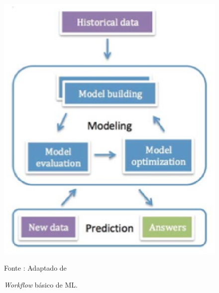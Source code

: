     \begin{figure}[ht]
            \centering
            \label{fig06}
                \includegraphics[keepaspectratio=true, scale=0.7]{editaveis/images/mlworkflow.eps}
            \caption{\textit{Workflow} básico de ML.}
            Fonte : Adaptado de \cite{brink2015}
    \end{figure}

